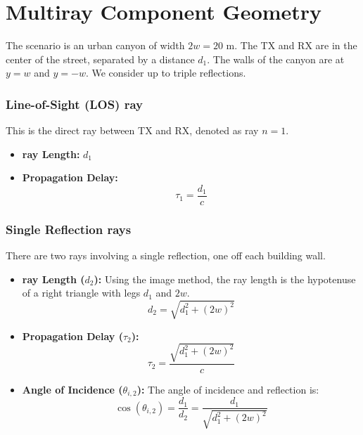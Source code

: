 \section{Multiray Component Geometry}
The scenario is an urban canyon of width $2w = 20$ m. The TX and RX are in the center of the street, separated by a distance $d_1$. The walls of the canyon are at $y = w$ and $y = -w$. We consider up to triple reflections.

\subsubsection{Line-of-Sight (LOS) ray}
This is the direct ray between TX and RX, denoted as ray $n=1$.
\begin{itemize}
	\item \textbf{ray Length:} $d_1$
	\item \textbf{Propagation Delay:}
	\begin{equation}
		\tau_1 = \frac{d_1}{c}
	\end{equation}
\end{itemize}

\subsubsection{Single Reflection rays}
There are two rays involving a single reflection, one off each building wall.
\begin{itemize}
	\item \textbf{ray Length ($d_2$):} Using the image method, the ray length is the hypotenuse of a right triangle with legs $d_1$ and $2w$.
	\begin{equation}
		d_2 = \sqrt{d_1^2 + (2w)^2}
	\end{equation}
	\item \textbf{Propagation Delay ($\tau_{2}$):}
	\begin{equation}
		\tau_{2} = \frac{\sqrt{d_1^2 + (2w)^2}}{c}
	\end{equation}
	\item \textbf{Angle of Incidence ($\theta_{i,2}$):} The angle of incidence and reflection is:
	\begin{equation}
		\cos(\theta_{i,2}) = \frac{d_1}{d_2} = \frac{d_1}{\sqrt{d_1^2 + (2w)^2}}
	\end{equation}
\end{itemize}

